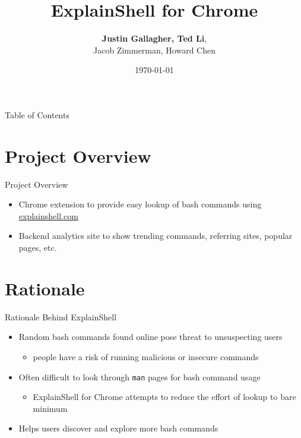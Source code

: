 \documentclass[xcolor=dvipsnames]{beamer}
\title{ExplainShell for Chrome}
\author{{\bf Justin Gallagher, Ted Li},\\ Jacob Zimmerman, Howard Chen}
\institute{Carnegie Mellon University}
\date{\today}
\begin{document}
\begin{frame}
\titlepage
\end{frame}

\begin{frame}{Table of Contents}
  \tableofcontents
\end{frame}

\section{Project Overview}\label{project-overview}
\begin{frame}{Project Overview}
\begin{itemize}
\itemsep8pt\parskip0pt
\item
  Chrome extension to provide easy lookup of bash commands using
  \href{http://www.explainshell.com/}{explainshell.com}
\item
  Backend analytics site to show trending commands, referring sites,
  popular pages, etc.
\end{itemize}
\end{frame}

\section{Rationale}\label{rationale}
\begin{frame}{Rationale Behind
ExplainShell}
\begin{itemize}
\itemsep5pt\parskip0pt
\item
  Random bash commands found online pose threat to unsuspecting users

  \begin{itemize}
  \itemsep3pt\parskip0pt
  \item
    people have a risk of running malicious or insecure commands
  \end{itemize}
  \pause
\item
  Often difficult to look through \texttt{man} pages for bash command
  usage
  \begin{itemize}
  \itemsep5pt\parskip0pt
  \item
    ExplainShell for Chrome attempts to reduce the effort of lookup to bare minimum
  \end{itemize}
  \pause
\item
  Helps users discover and explore more bash commands
\end{itemize}
\end{frame}
\end{document}

